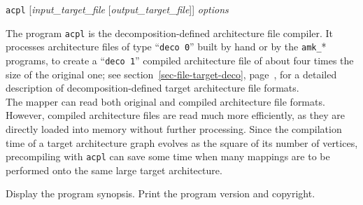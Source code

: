 \begin{itemize}
\progsyn
\texttt{acpl} [{\it input\_target\_file} [{\it output\_target\_file}]] {\it options}

\progdes
The program \texttt{acpl} is the decomposition-defined architecture file compiler.
It processes architecture files of type ``\texttt{deco~0}'' built by hand or by
the \texttt{amk\_}* programs, to create a ``\texttt{deco~1}'' compiled
architecture file of about four times the size of the original one;
see section~\ref{sec-file-target-deco}, page~\pageref{sec-file-target-deco},
for a detailed description of decomposition-defined target
architecture file formats.
\\
The mapper can read both original and compiled architecture file formats.
However, compiled architecture files are read much more efficiently, as
they are directly loaded into memory without further processing.
Since the compilation time of a target architecture graph evolves
as the square of its number of vertices, precompiling with \texttt{acpl} can
save some time when many mappings are to be performed onto the same large
target architecture.

\progopt
\begin{itemize}
\iteme[\texttt{-h}]
Display the program synopsis.
\iteme[\texttt{-V}]
Print the program version and copyright.
\end{itemize}
\end{itemize}

